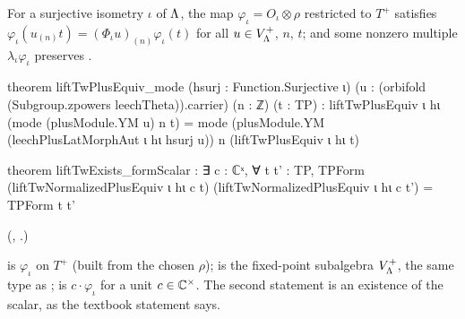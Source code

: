 \begin{theorem}\label{ch22:thm:twcov}
For a surjective isometry $\iota$ of ${\Lambda}$, the map $\varphi_\iota=O_\iota\otimes\rho$ restricted to $T^+$ satisfies
$\varphi_\iota(u_{(n)}t)=(\Phi_\iota u)_{(n)}\varphi_\iota(t)$ for all $u\in V_{\Lambda}^+$, $n$, $t$; and some nonzero
multiple $\lambda_\iota\varphi_\iota$ preserves .
\end{theorem}
\begin{leancode}
theorem liftTwPlusEquiv_mode (hsurj : Function.Surjective ι)
    (u : (orbifold (Subgroup.zpowers leechTheta)).carrier) (n : ℤ) (t : TP) :
    liftTwPlusEquiv ι hι (mode (plusModule.YM u) n t) =
      mode (plusModule.YM (leechPlusLatMorphAut ι hι hsurj u)) n (liftTwPlusEquiv ι hι t)
\end{leancode}
\begin{leancode}
theorem liftTwExists_formScalar : ∃ c : ℂˣ, ∀ t t' : TP,
    TPForm (liftTwNormalizedPlusEquiv ι hι c t)
      (liftTwNormalizedPlusEquiv ι hι c t') = TPForm t t'
\end{leancode}
(, .)
\begin{dictionary}
 is $\varphi_\iota$ on $T^+$ (built from the chosen $\rho$);
 is the fixed-point subalgebra $V_{\Lambda}^+$, the same type as
;  is $c\cdot\varphi_\iota$ for a unit $c\in{\mathbb{C}}^\times$.  The second
statement is an existence of the scalar, as the textbook statement says.
\end{dictionary}
